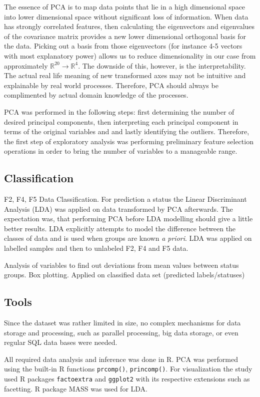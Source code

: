 \documentclass{article}
\begin{document}
The essence of PCA is to map data points that lie in a high dimensional space into lower dimensional space without significant loss of information. When data has strongly correlated features, then calculating the eigenvectors and eigenvalues of the covariance matrix provides a new lower dimensional orthogonal basis for the data. Picking out a basis from those eigenvectors (for instance 4-5 vectors with most explanatory power) allows us to reduce dimensionality in our case from approximately $\mathbb{R}^{20} \to \mathbb{R}^4$. The downside of this, however, is the interpretability. The actual real life meaning of new transformed axes may not be intuitive and explainable by real world processes. Therefore, PCA should always be complimented by actual domain knowledge of the processes.

PCA was performed in the following steps: first determining the number of desired principal components, then interpreting each principal component in terms of the original variables and and lastly identifying the outliers. Therefore, the first step of exploratory analysis was performing preliminary feature selection operations in order to bring the number of variables to a manageable range.
 
 \subsection{Classification}
F2, F4, F5 Data Classification.  For prediction a status the Linear Discriminant Analysis (LDA) was applied on data transformed by PCA afterwards. The expectation was, that performing PCA before LDA modelling should give a little better results. LDA explicitly attempts to model the difference between the classes of data and is used when groups are known \emph{a priori}.  LDA was applied on labelled samples and then to unlabeled F2, F4 and F5 data.
 
Analysis of variables to find out deviations from mean values between status groups. Box plotting.  Applied on classified data set (predicted labels/statuses) 

\subsection{Tools}
Since the dataset was rather limited in size, no complex mechanisms for data storage and processing, such as parallel processing, big data storage, or even regular SQL data bases were needed. 

All required data analysis and inference was done in R. PCA was performed using the built-in R functions \texttt{prcomp()}, \texttt{princomp()}. For visualization the study used R packages \texttt{factoextra} and \texttt{ggplot2} with its respective extensions such as facetting. R package MASS was used for LDA. 
\end{document}
